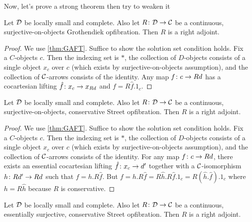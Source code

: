 \documentclass{amsart}
\begin{document}
Now, let's prove a strong theorem then try to weaken it

\begin{thm}
	Let $ \mathcal{D}$ be locally small and complete. Also let $ R \colon \mathcal{D} \to \mathcal{C} $ be a continuous, surjective-on-objects Grothendiek opfibration.  Then $ R $ is a right adjoint.
\end{thm}

\begin{proof}
	We use \ref{thm:GAFT}.  Suffice to show the solution set condition holds.  Fix a $ C $-objects $ c $.  Then the indexing set is $ \ast $, the collection of $ D $-objects consists of a single object $ x_c $ over $ c $ (which exists by surjective-on-objects assumption), and the collection of $ \mathcal{C} $-arrows consists of the identity.  Any map $ f \colon c \to Rd $ has a cocartesian lifting $ \hat{f} \colon x_c \to x_{Rd} $ and $ f = R \hat{f} . 1_c $.
\end{proof}

\begin{thm}
	Let $ \mathcal{D}$ be locally small and complete. Also let $ R \colon \mathcal{D} \to \mathcal{C} $ be a continuous, surjective-on-objects, conservative Street opfibration.  Then $ R $ is a right adjoint.
\end{thm}

\begin{proof}
	We use \ref{thm:GAFT}.  Suffice to show the solution set condition holds.  Fix a $ C $-objects $ c $.  Then the indexing set is $ \ast $, the collection of $ D $-objects consists of a single object $ x_c $ over $ c $ (which exists by surjective-on-objects assumption), and the collection of $ \mathcal{C} $-arrows consists of the identity.  For any map $ f \colon c \to Rd $, there exists an essential cocartesian lifting $ \hat{f} \colon x_c \to d' $ together with a $ \mathcal{C} $-isomorphism $ h \colon Rd' \to Rd $ such that $ f = h . R \hat{f} $. But $ f = h . R \hat{f} = R \hat{h} . R \hat{f} . 1_c = R (\hat{h} . \hat{f}) . 1_c $ where $ h = R \hat{h} $ because $ R $ is conservative.
\end{proof}

\begin{thm}
	Let $ \mathcal{D}$ be locally small and complete. Also let $ R \colon \mathcal{D} \to \mathcal{C} $ be a continuous, essentially surjective, conservative Street opfibration.  Then $ R $ is a right adjoint.
\end{thm}
\end{document}
